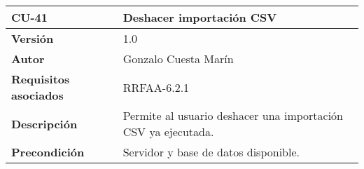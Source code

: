 \begin{longtable}[]{@{}ll@{}}
\toprule
\begin{minipage}[b]{0.16\columnwidth}\raggedright
\textbf{CU-41}\strut
\end{minipage} & \begin{minipage}[b]{0.78\columnwidth}\raggedright
\textbf{Deshacer importación CSV}\strut
\end{minipage}\tabularnewline
\midrule
\endhead
\begin{minipage}[t]{0.16\columnwidth}\raggedright
\textbf{Versión}\strut
\end{minipage} & \begin{minipage}[t]{0.78\columnwidth}\raggedright
1.0\strut
\end{minipage}\tabularnewline
\begin{minipage}[t]{0.16\columnwidth}\raggedright
\textbf{Autor}\strut
\end{minipage} & \begin{minipage}[t]{0.78\columnwidth}\raggedright
Gonzalo Cuesta Marín\strut
\end{minipage}\tabularnewline
\begin{minipage}[t]{0.16\columnwidth}\raggedright
\textbf{Requisitos asociados}\strut
\end{minipage} & \begin{minipage}[t]{0.78\columnwidth}\raggedright
RRFAA-6.2.1\strut
\end{minipage}\tabularnewline
\begin{minipage}[t]{0.16\columnwidth}\raggedright
\textbf{Descripción}\strut
\end{minipage} & \begin{minipage}[t]{0.78\columnwidth}\raggedright
Permite al usuario deshacer una importación CSV ya ejecutada.\strut
\end{minipage}\tabularnewline
\begin{minipage}[t]{0.16\columnwidth}\raggedright
\textbf{Precondición}\strut
\end{minipage} & \begin{minipage}[t]{0.78\columnwidth}\raggedright
Servidor y base de datos disponible.


\end{minipage}
\end{longtable}
